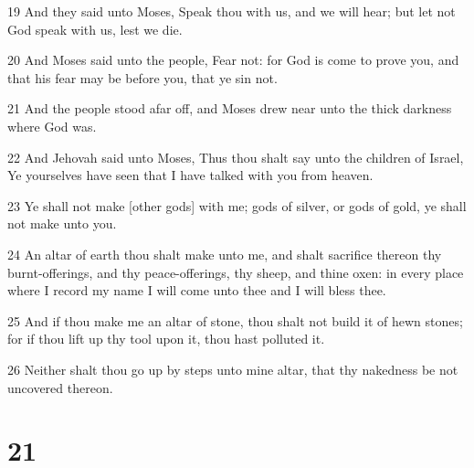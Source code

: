 \par 19 And they said unto Moses, Speak thou with us, and we will hear; but let not God speak with us, lest we die.
\par 20 And Moses said unto the people, Fear not: for God is come to prove you, and that his fear may be before you, that ye sin not.
\par 21 And the people stood afar off, and Moses drew near unto the thick darkness where God was.
\par 22 And Jehovah said unto Moses, Thus thou shalt say unto the children of Israel, Ye yourselves have seen that I have talked with you from heaven.
\par 23 Ye shall not make [other gods] with me; gods of silver, or gods of gold, ye shall not make unto you.
\par 24 An altar of earth thou shalt make unto me, and shalt sacrifice thereon thy burnt-offerings, and thy peace-offerings, thy sheep, and thine oxen: in every place where I record my name I will come unto thee and I will bless thee.
\par 25 And if thou make me an altar of stone, thou shalt not build it of hewn stones; for if thou lift up thy tool upon it, thou hast polluted it.
\par 26 Neither shalt thou go up by steps unto mine altar, that thy nakedness be not uncovered thereon.

\chapter{21}

